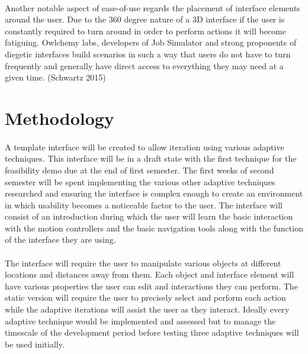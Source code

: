 \documentclass[11pt]{article}
\begin{document}
\paragraph{} 
Another notable aspect of ease-of-use regards the placement of interface elements around the user. Due to the 360 degree nature of a 3D interface if the user is constantly required to turn around in order to perform actions it will become fatiguing. Owlchemy labs, developers of Job Simulator and strong proponents of diegetic interfaces build scenarios in such a way that users do not have to turn frequently and generally have direct access to everything they may need at a given time. (Schwartz 2015)


\section{Methodology}

\paragraph{}
A template interface will be created to allow iteration using various adaptive techniques. This interface will be in a draft state with the first technique for the feasibility demo due at the end of first semester. The first weeks of second semester will be spent implementing the various other adaptive techniques researched and ensuring the interface is complex enough to create an environment in which usability becomes a noticeable factor to the user. The interface will consist of an introduction during which the user will learn the basic interaction with the motion controllers and the basic navigation tools along with the function of the interface they are using.

\paragraph{}
The interface will require the user to manipulate various objects at different locations and distances away from them. Each object and interface element will have various properties the user can edit and interactions they can perform. The static version will require the user to precisely select and perform each action while the adaptive iterations will assist the user as they interact. Ideally every adaptive technique would be implemented and assessed but to manage the timescale of the development period before testing three adaptive techniques will be used initially.
\end{document}
